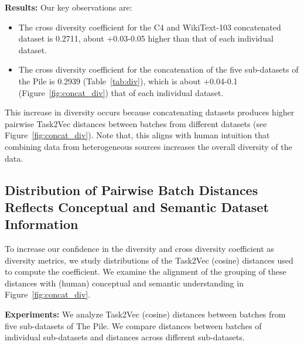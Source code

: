 \textbf{Results:}
Our key observations are:
\begin{itemize}
    \item The cross diversity coefficient for the C4 and WikiText-103 concatenated dataset is 0.2711, about +0.03-0.05 higher than that of each individual dataset.
    \item The cross diversity coefficient for the concatenation of the five sub-datasets of the Pile is 0.2939 (Table~\ref{tab:div}), which is about +0.04-0.1 (Figure~\ref{fig:concat_div}) that of each individual dataset.
\end{itemize}
This increase in diversity occurs because concatenating datasets produces higher pairwise Task2Vec distances between batches from different datasets (see Figure~\ref{fig:concat_div}).
Note that, this aligns with human intuition that combining data from heterogeneous sources increases the overall diversity of the data.

\subsection{Distribution of Pairwise Batch Distances Reflects Conceptual and Semantic Dataset Information}
To increase our confidence in the diversity and cross diversity coefficient as diversity metrics, we study distributions of the Task2Vec (cosine) distances used to compute the coefficient.
We examine the alignment of the grouping of these distances with (human) conceptual and semantic understanding in Figure~\ref{fig:concat_div}.

\textbf{Experiments:}
We analyze Task2Vec (cosine) distances between batches from five sub-datasets of The Pile.
We compare distances between batches of individual sub-datasets and distances across different sub-datasets.

